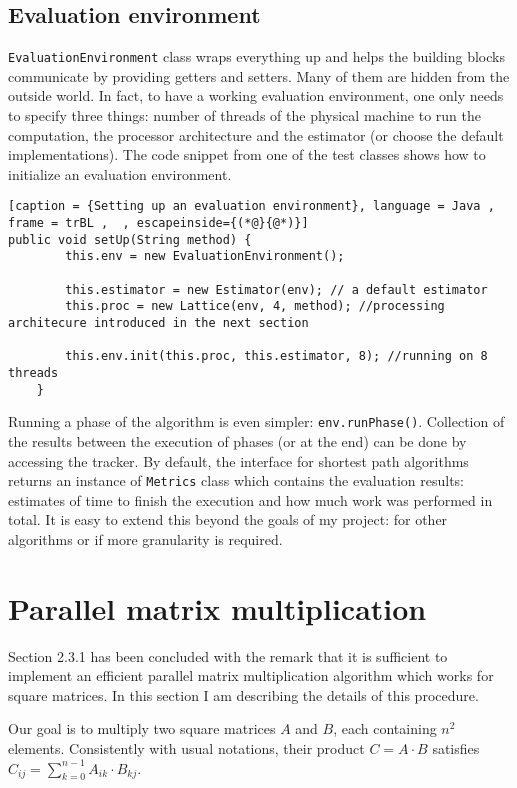 \documentclass[12pt,a4paper,twoside,openright]{report}
\begin{document}
\subsection{Evaluation environment}
\texttt{EvaluationEnvironment} class wraps everything up and helps the building blocks communicate by providing getters and setters. Many of them are hidden from the outside world. In fact, to have a working evaluation environment, one only needs to specify three things: number of threads of the physical machine to run the computation, the processor architecture and the estimator (or choose the default implementations). The code snippet from one of the test classes shows how to initialize an evaluation environment. 

\begin{lstlisting}[caption = {Setting up an evaluation environment}, language = Java , frame = trBL ,  , escapeinside={(*@}{@*)}]
public void setUp(String method) {
        this.env = new EvaluationEnvironment();

        this.estimator = new Estimator(env); // a default estimator
        this.proc = new Lattice(env, 4, method); //processing architecure introduced in the next section

        this.env.init(this.proc, this.estimator, 8); //running on 8 threads
    }

\end{lstlisting}

Running a phase of the algorithm is even simpler: \texttt{env.runPhase()}. Collection of the results between the execution of phases (or at the end) can be done by accessing the tracker. By default, the interface for shortest path algorithms returns an instance of \texttt{Metrics} class which contains the evaluation results: estimates of time to finish the execution and how much work was performed in total. It is easy to extend this beyond the goals of my project: for other algorithms or if more granularity is required. 

\section{Parallel matrix multiplication}
Section 2.3.1 has been concluded with the remark that it is sufficient to implement an efficient parallel matrix multiplication algorithm which works for square matrices. In this section I am describing the details of this procedure.

Our goal is to multiply two square matrices $A$ and $B$, each containing $n^2$ elements. Consistently with usual notations, their product $C=A\cdot B$ satisfies $C_{ij} = \sum_{k=0}^{n-1} A_{ik}\cdot B_{kj}$. 
\end{document}

